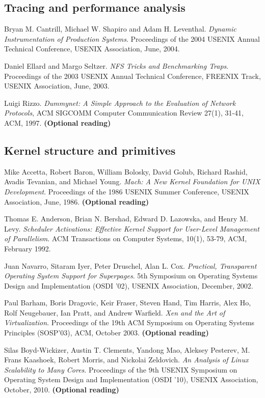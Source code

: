 \documentclass[a4paper,10pt]{article}
\begin{document}
\subsection*{Tracing and performance analysis}

Bryan M. Cantrill, Michael W. Shapiro and Adam H. Leventhal.  \textit{Dynamic
Instrumentation of Production Systems}.  Proceedings of the 2004 USENIX Annual
Technical Conference, USENIX Association, June, 2004.

\medskip
\noindent
Daniel Ellard and Margo Seltzer.  \textit{NFS Tricks and Benchmarking Traps}.
Proceedings of the 2003 USENIX Annual Technical Conference, FREENIX Track,
USENIX Association, June, 2003.

\medskip
\noindent
Luigi Rizzo.  \textit{Dummynet: A Simple Approach to the Evaluation of Network
Protocols}, ACM SIGCOMM Computer Communication Review 27(1), 31-41, ACM, 1997.
\textbf{(Optional reading)}

\subsection*{Kernel structure and primitives}

Mike Accetta, Robert Baron, William Bolosky, David Golub, Richard Rashid,
Avadis Tevanian, and Michael Young. \textit{Mach: A New Kernel Foundation for
UNIX Development}.  Proceedings of the 1986 USENIX Summer Conference, USENIX
Association, June, 1986.  \textbf{(Optional reading)}

\medskip
\noindent
Thomas E. Anderson, Brian N. Bershad, Edward D. Lazowska, and Henry M. Levy.
\textit{Scheduler Activations: Effective Kernel Support for User-Level
Management of Parallelism}. ACM Transactions on Computer Systems, 10(1),
53-79, ACM, February 1992.

\medskip
\noindent
Juan Navarro, Sitaram Iyer, Peter Druschel, Alan L. Cox.  \textit{Practical,
Transparent Operating System Support for Superpages}.  5th Symposium on
Operating Systems Design and Implementation (OSDI '02), USENIX Association,
December, 2002.

\medskip
\noindent
Paul Barham, Boris Dragovic, Keir Fraser, Steven Hand, Tim Harris, Alex Ho,
Rolf Neugebauer, Ian Pratt, and Andrew Warfield.  \textit{Xen and the Art of
Virtualization}. Proceedings of the 19th ACM Symposium on Operating Systems
Principles (SOSP'03), ACM, October 2003.  \textbf{(Optional reading)}

\medskip
\noindent
Silas Boyd-Wickizer, Austin T. Clements, Yandong Mao, Aleksey Pesterev, M.
Frans Kaashoek, Robert Morris, and Nickolai Zeldovich.  \textit{An Analysis of
Linux Scalability to Many Cores}.  Proceedings of the 9th USENIX Symposium on
Operating System Design and Implementation (OSDI '10), USENIX Association,
October, 2010.  \textbf{(Optional reading)}
\end{document}
